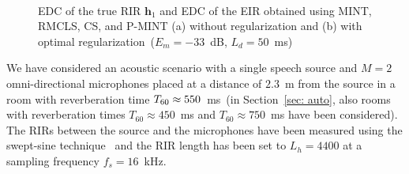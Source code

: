 \documentclass[10pt]{IEEEtran}
\begin{document}
\begin{figure}[b!]
\centering
\hbox{
}
\caption{EDC of the true RIR $\mathbf{h}_1$ and EDC of the EIR obtained using MINT, RMCLS, CS, and P-MINT (a) without regularization and (b) with optimal regularization~($E_m = -33$~dB, $L_d = 50$~ms)}
\end{figure}
We have considered an acoustic scenario with a single speech source and $M=2$ omni-directional microphones placed at a distance of $2.3$~m from the source in a room with reverberation time $T_{\rm 60} \approx 550$~ms~(in Section~\ref{sec: auto}, also rooms with reverberation times $T_{60} \approx 450$~ms and $T_{60} \approx 750$~ms have been considered).
The RIRs between the source and the microphones have been measured using the swept-sine technique~\cite{Farina_2000} and the RIR length has been set to $L_h = 4400$ at a sampling frequency $f_s = 16$~kHz.
\end{document}
